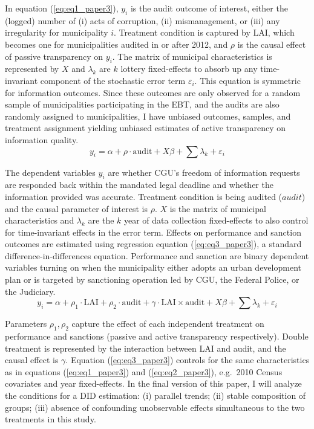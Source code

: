 \documentclass[11pt]{article}
\newcommand{\refp}[1]{(\ref{#1})}
\begin{document}
In equation \refp{eq:eq1_paper3}, $y_{i}$ is the audit outcome of interest, either the (logged) number of (i) acts of corruption, (ii) mismanagement, or (iii) any irregularity for municipality $i$. Treatment condition is captured by $\text{LAI}$, which becomes one for municipalities audited in or after 2012, and $\rho$ is the causal effect of passive transparency on $y_{i}$. The matrix of municipal characteristics is represented by $X$ and $\lambda_{k}$ are $k$ lottery fixed-effects to absorb up any time-invariant component of the stochastic error term $\varepsilon_{i}$. This equation is symmetric for information outcomes. Since these outcomes are only observed for a random sample of municipalities participating in the EBT, and the audits are also randomly assigned to municipalities, I have unbiased outcomes, samples, and treatment assignment yielding unbiased estimates of active transparency on information quality.
\begin{equation} \label{eq:eq2_paper3}
  y_{i} = \alpha + \rho \cdot \text{audit} + X \beta + \sum \lambda_{k} + \varepsilon_{i}
\end{equation}

The dependent variables $y_{i}$ are whether CGU's freedom of information requests are responded back within the mandated legal deadline and whether the information provided was accurate. Treatment condition is being audited ($audit$) and the causal parameter of interest is $\rho$. $X$ is the matrix of municipal characteristics and $\lambda_{k}$ are the $k$ year of data collection fixed-effects to also control for time-invariant effects in the error term. Effects on performance and sanction outcomes are estimated using regression equation \refp{eq:eq3_paper3}, a standard difference-in-differences equation. Performance and sanction are binary dependent variables turning on when the municipality either adopts an urban development plan or is targeted by sanctioning operation led by CGU, the Federal Police, or the Judiciary.
\begin{equation} \label{eq:eq3_paper3}
  y_{i} = \alpha + \rho_{1} \cdot \text{LAI} + \rho_{2} \cdot \text{audit} + \gamma \cdot \text{LAI} \times \text{audit} + X \beta + \sum \lambda_{k} + \varepsilon_{i}
\end{equation}

Parameters $\rho_{1}, \rho_{2}$ capture the effect of each independent treatment on performance and sanctions (passive and active transparency respectively). Double treatment is represented by the interaction between LAI and audit, and the causal effect is $\gamma$. Equation \refp{eq:eq3_paper3} controls for the same characteristics as in equations \refp{eq:eq1_paper3} and \refp{eq:eq2_paper3}, e.g.~2010 Census covariates and year fixed-effects. In the final version of this paper, I will analyze the conditions for a DID estimation: (i) parallel trends; (ii) stable composition of groups; (iii) absence of confounding unobservable effects simultaneous to the two treatments in this study.
\end{document}
